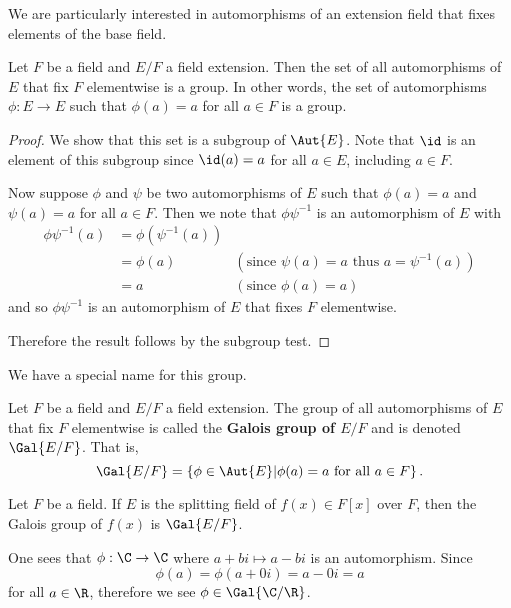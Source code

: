 We are particularly interested in automorphisms of an extension field that fixes elements of the base field.
\begin{proposition}\label{prop-galois-group-is-group}
    Let $F$ be a field and $E/F$ a field extension. Then the set of all automorphisms of $E$ that fix $F$ elementwise is a group. In other words, the set of automorphisms $\phi: E \to E$ such that $\phi(a) = a$ for all $a \in F$ is a group.
\end{proposition}
\begin{proof}
    We show that this set is a subgroup of $\Aut{E}$. Note that $\id$ is an element of this subgroup since $\id(a) = a$ for all $a \in E$, including $a \in F$.

    Now suppose $\phi$ and $\psi$ be two automorphisms of $E$ such that $\phi(a) = a$ and $\psi(a) = a$ for all $a \in F$. Then we note that $\phi\psi^{-1}$ is an automorphism of $E$ with
    \begin{align*}
        \phi\psi^{-1}(a) &= \phi(\psi^{-1}(a))\\
        &= \phi(a) & (\text{since }\psi(a) = a \text{ thus } a = \psi^{-1}(a))\\
        &= a & (\text{since }\phi(a) = a)
    \end{align*}
    and so $\phi\psi^{-1}$ is an automorphism of $E$ that fixes $F$ elementwise.

    Therefore the result follows by the subgroup test.
\end{proof}

We have a special name for this group.
\begin{definition}
    Let $F$ be a field and $E/F$ a field extension. The group of all automorphisms of $E$ that fix $F$ elementwise is called the \textbf{Galois group of $E/F$} and is denoted $\Gal{E/F}$. That is,
    \[
        \Gal{E/F} = \left\{\phi \in \Aut{E} \vert \phi(a) = a \text{ for all } a \in F\right\}.
    \]
\end{definition}
\begin{remark}
    Let $F$ be a field. If $E$ is the splitting field of $f(x) \in F[x]$ over $F$, then the Galois group of $f(x)$ is $\Gal{E/F}$.
\end{remark}

\begin{example}
    One sees that $\phi: \C \to \C$ where $a+bi \mapsto a - bi$ is an automorphism. Since
    \[
        \phi(a) = \phi(a + 0i) = a - 0i = a
    \]
    for all $a \in \R$, therefore we see $\phi \in \Gal{\C/\R}$.
\end{example}

